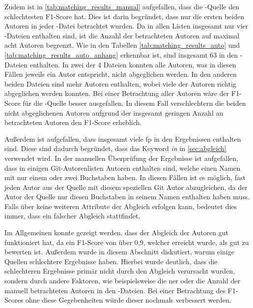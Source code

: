 Zudem ist in \autoref{tab:matching_results_manual} aufgefallen, dass die -Quelle den schlechtesten F1-Score hat.
Dies ist darin begründet, dass nur die ersten beiden Autoren in jeder -Datei betrachtet wurden.
Da in allen Listen insgesamt nur vier -Dateien enthalten sind, ist die Anzahl der betrachteten Autoren auf maximal acht Autoren begrenzt.
Wie in den Tabellen \ref{tab:matching_results_auto} und \ref{tab:matching_results_auto_anhang} erkennbar ist, sind insgesamt 63 in den -Dateien enthalten.
In zwei der 4 Dateien konnten alle Autoren, was in diesen Fällen jeweils ein Autor entspricht, nicht abgeglichen werden.
In den anderen beiden Dateien sind mehr Autoren enthalten, wobei viele der Autoren richtig abgeglichen werden konnten.
Bei einer Betrachtung aller Autoren wäre der F1-Score für die -Quelle besser ausgefallen.
In diesem Fall verschlechtern die beiden nicht abgeglichenen Autoren aufgrund der insgesamt geringen Anzahl an betrachteten Autoren den F1-Score erheblich.

Außerdem ist aufgefallen, dass insgesamt viele \gls{fp} in den Ergebnissen enthalten sind.
Diese sind dadurch begründet, dass das Keyword \emph{in} in \autoref{sec:abgleich} verwendet wird.
In der manuellen Überprüfung der Ergebnisse ist aufgefallen, dass in einigen Git-Autorenlisten Autoren enthalten sind, welche einen Namen mit nur einem oder zwei Buchstaben haben.
In diesen Fällen ist es möglich, fast jeden Autor aus der Quelle mit diesem speziellen Git Autor abzugleichen, da der Autor der Quelle nur diesen Buchstaben in seinem Namen enthalten haben muss.
Falls über keine weiteren Attribute der Abgleich erfolgen kann, bedeutet dies immer, dass ein falscher Abgleich stattfindet.

Im Allgemeinen konnte gezeigt werden, dass der Abgleich der Autoren gut funktioniert hat, da ein F1-Score von über 0,9, welcher erreicht wurde, als gut zu bewerten ist.
Außerdem wurde in diesem Abschnitt diskutiert, warum einige Quellen schlechtere Ergebnisse haben.
Hierbei wurde deutlich, dass die schlechteren Ergebnisse primär nicht durch den Abgleich verursacht wurden, sondern durch andere Faktoren, wie beispielsweise die \gls{ner} oder die Anzahl der manuell betrachteten Autoren in den -Dateien.
Bei einer Betrachtung des F1-Scores ohne diese Gegebenheiten würde dieser nochmals verbessert werden.


